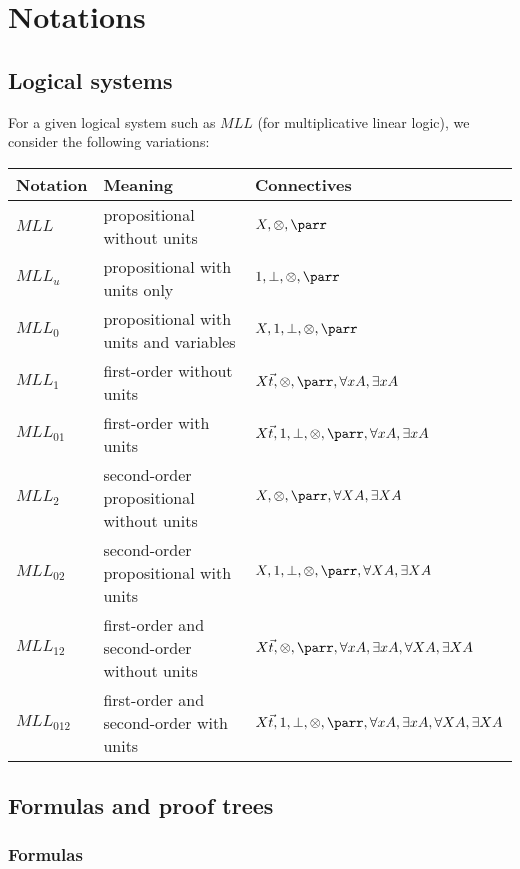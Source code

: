 \chapter{Notations}\label{notations}

\section{Logical systems}\label{logical-systems}

For a given logical system such as $MLL$ (for
multiplicative linear logic), we consider the following variations:
\begin{center}
\begin{tabular}{lll}
\hline
Notation & Meaning & Connectives\\
\hline
$MLL$ &
propositional without units &
$X,{\tens},{\parr}$\\
$MLL_u$ &
propositional with units only &
$\one,\bot,{\tens},{\parr}$\\
$MLL_0$ &
propositional with units and variables &
$X,\one,\bot,{\tens},{\parr}$\\
$MLL_1$ &
first-order without units &
$X\vec{t},{\tens},{\parr},\forall
x A,\exists x
A$\\
$MLL_{01}$ &
first-order with units &
$X\vec{t},\one,\bot,{\tens},{\parr},\forall
x A,\exists x
A$\\
$MLL_2$ &
second-order propositional without units &
$X,{\tens},{\parr},\forall
X A,\exists X
A$\\
$MLL_{02}$ &
second-order propositional with units &
$X,\one,\bot,{\tens},{\parr},\forall
X A,\exists X
A$\\
$MLL_{12}$ &
first-order and second-order without units &
$X\vec{t},{\tens},{\parr},\forall
x A,\exists x A,\forall X
A,\exists X
A$\\
$MLL_{012}$
& first-order and second-order with units &
$X\vec{t},\one,\bot,{\tens},{\parr},\forall x A,\exists x A,\forall X A,\exists X A$\\
\hline
\end{tabular}
\end{center}

\section{Formulas and proof trees}\label{formulas-and-proof-trees}

\subsection{Formulas}\label{formulas}

